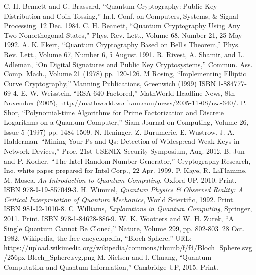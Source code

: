 \documentclass[conference]{IEEEtran}
\begin{document}
\begin{thebibliography}{15}
  C. H. Bennett and G. Brassard, ``Quantum Cryptography: Public Key Distribution and Coin Tossing,'' Intl. Conf. on Computers, Systems, \& Signal Processing, 12 Dec. 1984.
  C. H. Bennett, ``Quantum Cryptography Using Any Two Nonorthogonal States,'' Phys. Rev. Lett., Volume 68, Number 21, 25 May 1992.
  A. K. Ekert, ``Quantum Cryptography Based on Bell's Theorem,'' Phys. Rev. Lett., Volume 67, Number 6, 5 August 1991.
  R. Rivest, A. Shamir, and L. Adleman, ``On Digital Signatures and Public Key Cryptosystems,'' Commun. Ass. Comp. Mach., Volume 21 (1978) pp. 120-126.
  M Rosing, ``Implementing Elliptic Curve Cryptography,'' Manning Publications, Greenwich (1999) ISBN 1-884777-69-4.
  E. W. Weisstein, ``RSA-640 Factored,'' MathWorld Headline News, 8th November (2005),
  http://mathworld.wolfram.com/news/2005-11-08/rsa-640/.
  P. Shor, ``Polynomial-time Algorithms for Prime Factorization and Discrete Logarithms on a Quantum Computer,'' Siam Journal on Computing, Volume 26, Issue 5 (1997) pp. 1484-1509.
  N. Heninger, Z. Durumeric, E. Wustrow, J. A. Halderman, ``Mining Your Ps and Qs: Detection of Widespread Weak Keys in Network Devices,'' Proc. 21st USENIX Security Symposium, Aug. 2012.
  B. Jun and P. Kocher, ``The Intel Random Number Generator,'' Cryptography Research, Inc. white paper prepared for Intel Corp., 22 Apr. 1999.
  P. Kaye, R. LaFlamme, M. Mosca, \textit{An Introduction to Quantum Computing}, Oxford UP, 2010. Print. ISBN 978-0-19-857049-3.
  H. Wimmel, \textit{Quantum Physics \& Observed Reality: A Critical Interpretation of Quantum Mechanics}, World Scientific, 1992. Print. ISBN 981-02-1010-8.
  C. Williams, \textit{Explorations in Quantum Computing}, Springer, 2011. Print. ISBN 978-1-84628-886-9.
  W. K. Wootters and W. H. Zurek, ``A Single Quantum Cannot Be Cloned,'' Nature, Volume 299, pp. 802-803. 28 Oct. 1982.
  Wikipedia, the free encyclopedia, ``Bloch Sphere,''
  URL: https://upload.wikimedia.org/wikipedia/commons/thumb/f/f4/Bloch\_Sphere.svg/256px-Bloch\_Sphere.svg.png
  M. Nielsen and I. Chuang, ``Quantum Computation and Quantum Information,'' Cambridge UP, 2015. Print.
\end{thebibliography}




\end{document}
